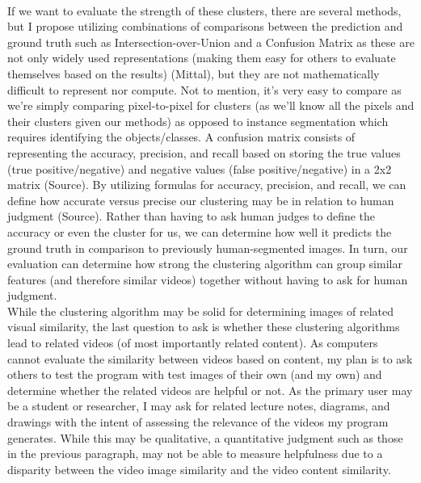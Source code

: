 \documentclass[10pt,twocolumn]{article}
\begin{document}
\\
\indent If we want to evaluate the strength of these clusters, there are several methods, but I propose utilizing combinations of comparisons between the prediction and ground truth such as Intersection-over-Union and a Confusion Matrix as these are not only widely used representations (making them easy for others to evaluate themselves based on the results) (Mittal), but they are not mathematically difficult to represent nor compute. Not to mention, it’s very easy to compare as we’re simply comparing pixel-to-pixel for clusters (as we’ll know all the pixels and their clusters given our methods) as opposed to instance segmentation which requires identifying the objects/classes.
A confusion matrix consists of representing the accuracy, precision, and recall based on storing the true values (true positive/negative) and negative values (false positive/negative) in a 2x2 matrix (Source). By utilizing formulas for accuracy, precision, and recall, we can define how accurate versus precise our clustering may be in relation to human judgment (Source). Rather than having to ask human judges to define the accuracy or even the cluster for us, we can determine how well it predicts the ground truth in comparison to previously human-segmented images. In turn, our evaluation can determine how strong the clustering algorithm can group similar features (and therefore similar videos) together without having to ask for human judgment.
\\
\indent	While the clustering algorithm may be solid for determining images of related visual similarity, the last question to ask is whether these clustering algorithms lead to related videos (of most importantly related content). As computers cannot evaluate the similarity between videos based on content, my plan is to ask others to test the program with test images of their own (and my own) and determine whether the related videos are helpful or not. As the primary user may be a student or researcher, I may ask for related lecture notes, diagrams, and drawings with the intent of assessing the relevance of the videos my program generates. While this may be qualitative, a quantitative judgment such as those in the previous paragraph, may not be able to measure helpfulness due to a disparity between the video image similarity and the video content similarity.


\printbibliography
\end{document}
